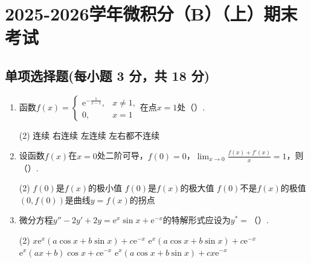 \documentclass[../Main.tex]{subfiles}
\begin{document}
\chapter{2025-2026学年微积分（B）（上）期末考试}

\section{单项选择题(每小题 3 分，共 18 分)}
\begin{enumerate}
    \item 函数$f(x)=
              \begin{cases}
                  \mathrm{e}^{-\frac{1}{x-1}}, & x\neq1, \\
                  0,                           & x=1
              \end{cases}$在点$x=1$处（\qquad）.

          \begin{tasks}[label=\textbf{\Alph*.}, label-width=1.5em, column-sep=1em](2)
              \task 连续
              \task 右连续
              \task 左连续
              \task 左右都不连续
          \end{tasks}
          \vspace{1em}

    \item 设函数$f(x)$在$x=0$处二阶可导，$f(0)=0$，$\lim_{x\to0}\frac{f(x)+f'(x)}{x}
              =1$，则（\qquad）.

          \begin{tasks}[label=\textbf{\Alph*.}, label-width=1.5em, column-sep=1em](2)
              \task $f(0)$是$f(x)$的极小值
              \task $f(0)$是$f(x)$的极大值
              \task $f(0)$不是$f(x)$的极值
              \task $(0,f(0))$是曲线$y=f(x)$的拐点
          \end{tasks}
          \vspace{1em}

    \item 微分方程$y''-2y'+2y=\mathrm{e}^{x}\sin x+\mathrm{e}^{-x}$的特解形式应设为$y
                  ^{*}=$（\qquad）.

          \begin{tasks}[label=\textbf{\Alph*.}, label-width=1.5em, column-sep=1em](2)
              \task $x\mathrm{e}^{x}(a\cos x+b\sin x)+c\mathrm{e}^{-x}$
              \task $\mathrm{e}^{x}(a\cos x+b\sin x)+c\mathrm{e}^{-x}$
              \task $\mathrm{e}^{x}(ax+b)\cos x+c\mathrm{e}^{-x}$
              \task $\mathrm{e}^{x}(a\cos x+b\sin x)+cx\mathrm{e}^{-x}$
          \end{tasks}
          \vspace{1em}


\end{enumerate}
\end{document}
